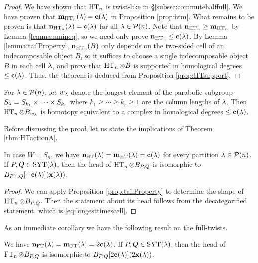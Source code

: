 \begin{proof} We have shown that $\operatorname{HT}_n$ is twist-like in \S\ref{subsec:commutehalffull}. We have proven that ${\mathbf m}_{\operatorname{HT}_n}(\lambda) = \mathbf{c}(\lambda)$ in Proposition \ref{prop:htm}. What remains to be proven is that ${\mathbf n}_{\operatorname{HT}_n}(\lambda) = \mathbf{c}(\lambda)$ for all $\lambda \in {\mathcal{P}}(n)$. Note that ${\mathbf n}_{\operatorname{HT}_n} \ge {\mathbf m}_{\operatorname{HT}_n}$ by Lemma \ref{lemma:nmineq}, so we need only prove ${\mathbf n}_{\operatorname{HT}_n} \le \mathbf{c}(\lambda)$. By Lemma \ref{lemma:tailProperty}, ${\mathbf n}_{\operatorname{HT}_n}(B)$ only depends on the two-sided cell of an indecomposable object $B$, so it suffices to choose a single indecomposable object $B$ in each cell $\lambda$, and prove that $\operatorname{HT}_n \otimes B$ is supported in homological degrees $\le \mathbf{c}(\lambda)$. Thus, the theorem is deduced from Proposition \ref{prop:HTsupport}. \end{proof}

\begin{prop}\label{prop:HTsupport}
For $\lambda\in {\mathcal{P}}(n)$, let $w_\lambda$ denote the longest element of the parabolic subgroup $S_\lambda = S_{k_1}\times \cdots \times S_{k_r}$ where $k_1\geq \cdots \geq k_r\geq 1$ are the column lengths of $\lambda$. Then $\operatorname{HT}_n\otimes B_{w_\lambda}$ is homotopy equivalent to a complex in homological degrees $\le \mathbf{c}(\lambda)$.
\end{prop}

Before discussing the proof, let us state the implications of Theorem \ref{thm:HTactionA}.

\begin{theorem}\label{thm:halftwistprops}
In case $W=S_n$, we have ${\mathbf n}_{\operatorname{HT}}(\lambda)={\mathbf m}_{\operatorname{HT}}(\lambda)=\mathbf{c}(\lambda)$ for every partition $\lambda\in {\mathcal{P}}(n)$.  If $P,Q\in \operatorname{SYT}(\lambda)$, then the head of $\operatorname{HT}_n\otimes B_{P,Q}$ is isomorphic to $B_{P^\vee,Q}[-\mathbf{c}(\lambda)](\mathbf{x}(\lambda))$.  
\end{theorem}

\begin{proof} We can apply Proposition \ref{prop:tailProperty} to determine the shape of $\operatorname{HT}_n \otimes B_{P,Q}$. Then the statement about its head follows from the decategorified statement, which is \eqref{eq:longesttimescell}. \end{proof}

As an immediate corollary we have the following result on the full-twists.

\begin{corollary}\label{cor:fulltwistprops}
We have ${\mathbf n}_{\operatorname{FT}}(\lambda)={\mathbf m}_{\operatorname{FT}}(\lambda)=2\mathbf{c}(\lambda)$.  If $P,Q\in \operatorname{SYT}(\lambda)$, then the head of $\operatorname{FT}_n\otimes B_{P,Q}$ is isomorphic to $B_{P,Q}[2\mathbf{c}(\lambda)](2\mathbf{x}(\lambda))$.
\end{corollary}

